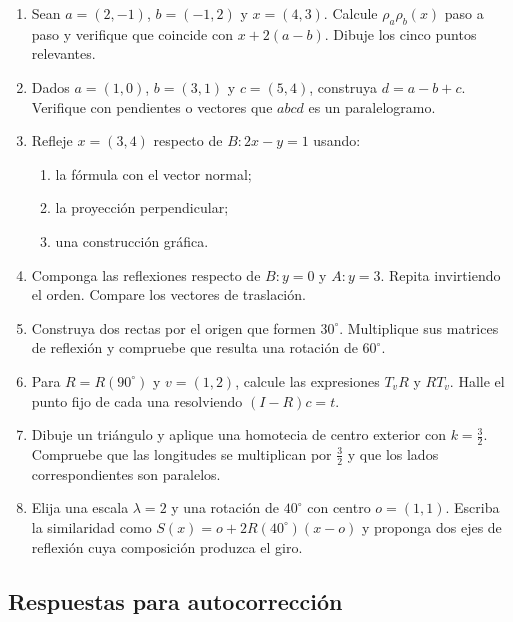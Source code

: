 \begin{enumerate}
  \item Sean \(a=(2,-1)\), \(b=(-1,2)\) y \(x=(4,3)\). Calcule
  \(\rho_a\rho_b(x)\) paso a paso y verifique que coincide con
  \(x+2(a-b)\). Dibuje los cinco puntos relevantes.

  \item Dados \(a=(1,0)\), \(b=(3,1)\) y \(c=(5,4)\), construya
  \(d=a-b+c\). Verifique con pendientes o vectores que \(abcd\) es un
  paralelogramo.

  \item Refleje \(x=(3,4)\) respecto de \(B:2x-y=1\) usando:
  \begin{enumerate}[label=\alph*)]
    \item la fórmula con el vector normal;
    \item la proyección perpendicular;
    \item una construcción gráfica.
  \end{enumerate}

  \item Componga las reflexiones respecto de \(B:y=0\) y \(A:y=3\).
  Repita invirtiendo el orden. Compare los vectores de traslación.

  \item Construya dos rectas por el origen que formen \(30^\circ\).
  Multiplique sus matrices de reflexión y compruebe que resulta una rotación
  de \(60^\circ\).

  \item Para \(R=R(90^\circ)\) y \(v=(1,2)\), calcule las expresiones
  \(T_vR\) y \(RT_v\). Halle el punto fijo de cada una resolviendo
  \((I-R)c=t\).

  \item Dibuje un triángulo y aplique una homotecia de centro exterior con
  \(k=\frac32\). Compruebe que las longitudes se multiplican por
  \(\frac32\) y que los lados correspondientes son paralelos.

  \item Elija una escala \(\lambda=2\) y una rotación de \(40^\circ\) con
  centro \(o=(1,1)\). Escriba la similaridad como
  \(S(x)=o+2R(40^\circ)(x-o)\) y proponga dos ejes de reflexión cuya
  composición produzca el giro.
\end{enumerate}

\subsection{Respuestas para autocorrección}

